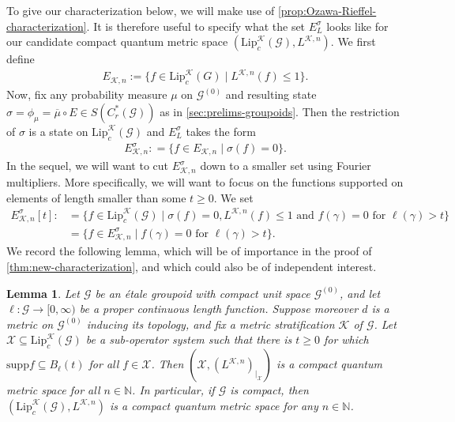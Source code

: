 \documentclass[11pt,a4paper,oneside,final,reqno]{amsart}
\newtheorem{lemma}{Lemma}[section]
\theoremstyle{definition}
\newcommand{\G}{\mathcal{G}}
\newcommand{\Go}{\mathcal{G}^{(0)}}
\newcommand{\cK}{\mathcal{K}}
\newcommand{\cX}{\mathcal{X}}
\newcommand{\supp}{\mathrm{supp}}
\newcommand{\Lip}{\mathrm{Lip}}
\newcommand{\Cred}{C_{r}^{*}}
\newcommand{\N}{\mathbb{N}}
\numberwithin{equation}{section}
\begin{document}
	
	To give our characterization below, we will make use of \cref{prop:Ozawa-Rieffel-characterization}. It is therefore useful to specify what the set 
	$E^\sigma_L$
	looks like for our candidate compact quantum metric space 
	$(\Lip_c^{\cK}(\G), L^{\cK,n})$.
	We first define 
	\begin{align}\label{eq:def-E-set}
		E_{\cK, n} := \{ f \in \Lip_c^\cK (G) \mid L^{\cK, n}(f) \leq 1\}.
	\end{align}
	Now, 
	fix
	any probability measure $\mu$ on $\Go$ and resulting state $\sigma=\phi_\mu = \overline{\mu} \circ E  \in S(\Cred(\G))$ as in \cref{sec:prelims-groupoids}. Then
	the restriction of 
	$\sigma$ 
	is 
	a state on
	$\Lip_c^{\cK}(\G)$
	and 
	$E^\sigma_L$
	takes the  form 
	\begin{align}\label{eq:BL-for-groupoids}
	E^\sigma_{\cK, n}: = \{ f \in E_{\cK, n} \mid \sigma(f) = 0  \}.
	\end{align}
	In the sequel, we will want to cut 
	$ E^\sigma_{\cK, n}$
	down to a smaller set using Fourier multipliers. More specifically, we will want to focus on the functions supported on elements of length smaller than some $t \geq 0$. We set
	\begin{equation}\label{eq:BLt-for-groupoids}
		\begin{split}
		E^\sigma_{\cK, n}[t] :&= \{  f\in \Lip_c^{\cK}(\G) \mid \sigma (f) = 0, L^{\cK, n}(f) \leq 1 \text{ and $f(\gamma) = 0$ for $\ell(\gamma) > t$}    \}\\
		&= \{ f \in E^\sigma_{\cK, n} \mid f(\gamma) = 0 \text{ for $\ell(\gamma)> t$}\}.
		\end{split}
	\end{equation}
	We record the following lemma, which will be of importance in the proof of \cref{thm:new-characterization}, and which could also be of independent interest. 
	
	\begin{lemma}\label{lemma:compact-subsets-yield-CQMS}
		Let $\G$ be an \'etale groupoid with compact unit space $\Go$, and let $\ell \colon \G \to [0,\infty)$ be a proper continuous length function. 
		Suppose moreover $d$ is a metric on $\Go$ inducing its topology, and fix a metric stratification $\cK$ of $\G$.
		Let 
		$\cX \subseteq  \Lip_c^{\cK}(\G)$
		be a sub-operator system such that there is $t \geq 0$ for which $\supp f \subseteq B_\ell(t)$ for all $f \in \cX$. 
		Then $(\cX, (L^{\cK, n})_{\vert_{\cX}})$ is a compact quantum metric space for all $n\in \N$. In particular, if $\G$ is compact, 
		then 
		$( \Lip_c^{\cK}(\G), L^{\cK, n})$
		is a compact quantum metric space for any $n \in \N$. 
	\end{lemma}
\end{document}

